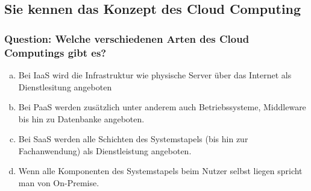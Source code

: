 \documentclass{article}
\begin{document}
\begin{adjustwidth}{2em}{2em}
\begin{adjustwidth}{2em}{2em}
			\subsection{Sie kennen das Konzept des Cloud Computing}
			\begin{adjustwidth}{1em}{}
				\subsubsection*{Question: Welche verschiedenen Arten des Cloud Computings gibt es?}
				\begin{adjustwidth}{1em}{}
					\begin{enumerate}[(a)]
						\item Bei IaaS wird die Infrastruktur wie physische Server über das Internet als Dienstlesitung angeboten
						\item Bei PaaS werden zusätzlich unter anderem auch Betriebssysteme, Middleware bis hin zu Datenbanke angeboten.
						\item Bei SaaS werden alle Schichten des Systemstapels (bis hin zur Fachanwendung) als Dienstleistung angeboten.
						\item Wenn alle Komponenten des Systemstapels beim Nutzer selbst liegen spricht man von On-Premise.
					\end{enumerate}
				\end{adjustwidth}
			\end{adjustwidth}
		\end{adjustwidth}		
		
	\end{adjustwidth}
	
	\newpage
	\setcounter{section}{0}
\end{document}
